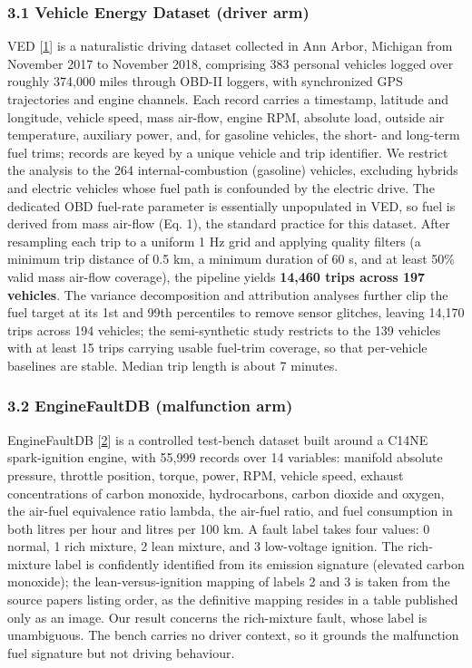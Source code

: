 \subsubsection{3.1 Vehicle Energy Dataset (driver
arm)}\label{vehicle-energy-dataset-driver-arm}

VED {[}\hyperref[r1]{1}{]} is a naturalistic driving dataset collected
in Ann Arbor, Michigan from November 2017 to November 2018, comprising
383 personal vehicles logged over roughly 374,000 miles through OBD-II
loggers, with synchronized GPS trajectories and engine channels. Each
record carries a timestamp, latitude and longitude, vehicle speed, mass
air-flow, engine RPM, absolute load, outside air temperature, auxiliary
power, and, for gasoline vehicles, the short- and long-term fuel trims;
records are keyed by a unique vehicle and trip identifier. We restrict
the analysis to the 264 internal-combustion (gasoline) vehicles,
excluding hybrids and electric vehicles whose fuel path is confounded by
the electric drive. The dedicated OBD fuel-rate parameter is essentially
unpopulated in VED, so fuel is derived from mass air-flow (Eq. 1), the
standard practice for this dataset. After resampling each trip to a
uniform 1 Hz grid and applying quality filters (a minimum trip distance
of 0.5 km, a minimum duration of 60 s, and at least 50\% valid mass
air-flow coverage), the pipeline yields \textbf{14,460 trips across 197
vehicles}. The variance decomposition and attribution analyses further
clip the fuel target at its 1st and 99th percentiles to remove sensor
glitches, leaving 14,170 trips across 194 vehicles; the semi-synthetic
study restricts to the 139 vehicles with at least 15 trips carrying
usable fuel-trim coverage, so that per-vehicle baselines are stable.
Median trip length is about 7 minutes.

\subsubsection{3.2 EngineFaultDB (malfunction
arm)}\label{enginefaultdb-malfunction-arm}

EngineFaultDB {[}\hyperref[r2]{2}{]} is a controlled test-bench dataset
built around a C14NE spark-ignition engine, with 55,999 records over 14
variables: manifold absolute pressure, throttle position, torque, power,
RPM, vehicle speed, exhaust concentrations of carbon monoxide,
hydrocarbons, carbon dioxide and oxygen, the air-fuel equivalence ratio
lambda, the air-fuel ratio, and fuel consumption in both litres per hour
and litres per 100 km. A fault label takes four values: 0 normal, 1 rich
mixture, 2 lean mixture, and 3 low-voltage ignition. The rich-mixture
label is confidently identified from its emission signature (elevated
carbon monoxide); the lean-versus-ignition mapping of labels 2 and 3 is
taken from the source paper\textquotesingle s listing order, as the
definitive mapping resides in a table published only as an image. Our
result concerns the rich-mixture fault, whose label is unambiguous. The
bench carries no driver context, so it grounds the malfunction fuel
signature but not driving behaviour.

